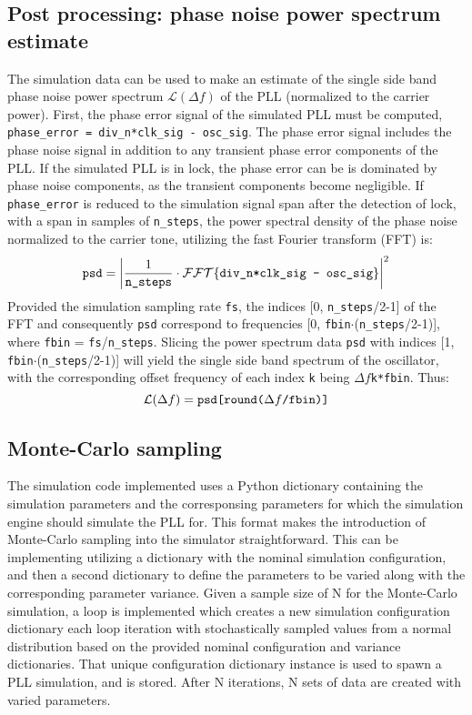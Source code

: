 \subsection{Post processing: phase noise power spectrum estimate}
The simulation data can be used to make an estimate of the single side band phase noise power spectrum $\mathcal{L}(\Delta f)$ of the PLL (normalized to the carrier power). First, the phase error signal of the simulated PLL must be computed, \texttt{phase\_error = div\_n*clk\_sig - osc\_sig}. The phase error signal includes the phase noise signal in addition to any transient phase error components of the PLL. If the simulated PLL is in lock, the phase error can be is dominated by phase noise components, as the transient components become negligible. If \texttt{phase\_error} is reduced to the simulation signal span after the detection of lock, with a span in samples of \texttt{n\_steps}, the power spectral density of the phase noise normalized to the carrier tone, utilizing the fast Fourier transform (FFT) is:
\begin{equation}
	\text{\texttt{psd}} = \left|\frac{1}{\text{\texttt{n\_steps}}}\cdot\mathcal{FFT}\{\text{\texttt{div\_n*clk\_sig - osc\_sig}}\}\right|^2
\end{equation}
Provided the simulation sampling rate \texttt{fs}, the indices [0, \texttt{n\_steps}/2-1] of the FFT and consequently \texttt{psd} correspond to frequencies [0, \texttt{fbin}$\cdot$(\texttt{n\_steps}/2-1)], where \texttt{fbin} = \texttt{fs}/\texttt{n\_steps}. Slicing the power spectrum data \texttt{psd} with indices [1, \texttt{fbin}$\cdot$(\texttt{n\_steps}/2-1)] will yield the single side band spectrum of the oscillator, with the corresponding offset frequency of each index \texttt{k} being $\Delta f$\texttt{k*fbin}. Thus:
\begin{equation}
	\mathcal{L}(\Delta f) = \text{\texttt{psd[round(}}\Delta f\text{\texttt{/fbin)]}}
\end{equation}

\subsection{Monte-Carlo sampling}
The simulation code implemented uses a Python dictionary containing the simulation parameters and the corresponsing parameters for which the simulation engine should simulate the PLL for. This format makes the introduction of Monte-Carlo sampling into the simulator straightforward. This can be implementing utilizing a dictionary with the nominal simulation configuration, and then a second dictionary to define the parameters to be varied along with the corresponding parameter variance. Given a sample size of N for the Monte-Carlo simulation, a loop is implemented which creates a new simulation configuration dictionary each loop iteration with stochastically sampled values from a normal distribution based on the provided nominal configuration and variance dictionaries. That unique configuration dictionary instance is used to spawn a PLL simulation, and is stored. After N iterations, N sets of data are created with varied parameters.

